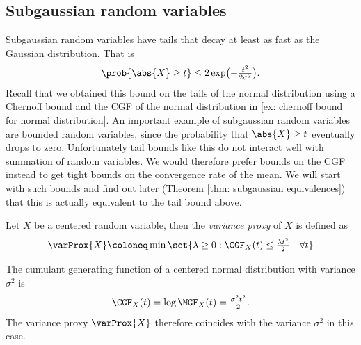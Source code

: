 \subsection{Subgaussian random variables}

Subgaussian random variables have tails that decay at least as fast as the
Gaussian distribution. That is
\[
    \prob{\abs{X} \ge t} \le 2 \exp\bigl(-\tfrac{t^2}{2\sigma^2}\bigr).
\]
Recall that we obtained this bound on the tails of the normal distribution using
a Chernoff bound and the CGF of the normal distribution in \eqref{ex: chernoff
bound for normal distribution}.
An important example of subgaussian random variables
are bounded random variables, since the probability 
that \(\abs{X} \ge t\) eventually drops to zero.
Unfortunately tail bounds like this do not interact
well with summation of random variables. We would therefore prefer bounds on the
CGF instead to get tight bounds on the convergence rate of the mean. We will
start with such bounds and find out later (Theorem \ref{thm: subgaussian
equivalences}) that this is actually equivalent to the tail bound above.

\begin{definition}
    Let \(X\) be a \underline{centered} random variable, then
    the \emph{variance proxy} of \(X\) is defined as
    \[
        \varProx{X} \coloneq \min\set{\lambda \ge 0 : \CGF_X(t) \le \tfrac{\lambda t^2}2 \quad \forall t}
    \]
\end{definition}

The cumulant generating function of a centered normal distribution with variance
\(\sigma^2\) is
\[
    \CGF_X(t) = \log \MGF_X(t) = \tfrac{\sigma^2t^2}{2}.
\]
The variance proxy \(\varProx{X}\) therefore coincides with the variance \(\sigma^2\) in
this case.


